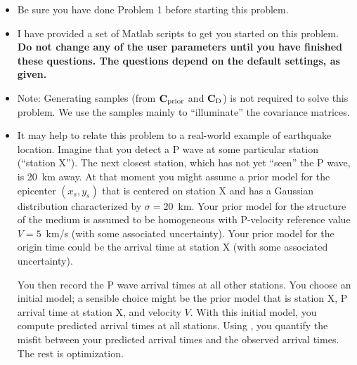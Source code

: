 \documentclass[11pt,titlepage,fleqn]{article}
\begin{document}
\begin{itemize}
\item Be sure you have done Problem 1 before starting this problem.

\item I have provided a set of Matlab scripts to get you started on this problem. {\bf Do not change any of the user parameters until you have finished these questions. The questions depend on the default settings, as given.}

\item Note: Generating samples (from $\mbox{${\bf C}$}_{\rm prior}$ and $\mbox{${\bf C}$}_{\rm D}$) is not required to solve this problem. We use the samples mainly to ``illuminate'' the covariance matrices.

\item It may help to relate this problem to a real-world example of earthquake location. Imagine that you detect a P wave at some particular station (``station X''). The next closest station, which has not yet ``seen'' the P wave, is 20~km away. At that moment you might assume a prior model for the epicenter $(x_s, y_s)$ that is centered on station X and has a Gaussian distribution characterized by $\sigma = 20$~km. 
Your prior model for the structure of the medium is assumed to be homogeneous with P-velocity reference value $V = 5$~km/s (with some associated uncertainty). Your prior model for the origin time could be the arrival time at station X (with some associated uncertainty).

You then record the P wave arrival times at all other stations. You choose an initial model; a sensible choice might be the prior model that is station X, P arrival time at station X, and velocity $V$. With this initial model, you compute predicted arrival times at all stations. Using , you quantify the misfit between your predicted arrival times and the observed arrival times. The rest is optimization.

\end{itemize}

\end{document}
